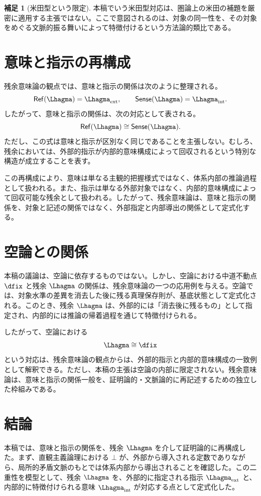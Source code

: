 \documentclass[11pt,a4paper]{article}
\newcommand{\refe}{\mathsf{Ref}}
\newcommand{\sense}{\mathsf{Sense}}
\newcommand{\lext}{\Lhagma_{\mathrm{ext}}}
\newcommand{\lint}{\Lhagma_{\mathrm{int}}}
\theoremstyle{definition}
\newtheorem{remark}{補足}[section]
\begin{document}
\begin{remark}[米田型という限定]
本稿でいう米田型対応は、圏論上の米田の補題を厳密に適用する主張ではない。ここで意図されるのは、対象の同一性を、その対象をめぐる文脈的振る舞いによって特徴付けるという方法論的類比である。
\end{remark}

\section{意味と指示の再構成}

残余意味論の観点では、意味と指示の関係は次のように整理される。
\[
\refe(\Lhagma) = \lext,
\qquad
\sense(\Lhagma) = \lint .
\]
したがって、意味と指示の関係は、次の対応として表される。
\[
\refe(\Lhagma) \cong \sense(\Lhagma).
\]
ただし、この式は意味と指示が区別なく同じであることを主張しない。むしろ、残余においては、外部的指示が内部的意味構成によって回収されるという特別な構造が成立することを表す。

この再構成により、意味は単なる主観的把握様式ではなく、体系内部の推論過程として扱われる。また、指示は単なる外部対象ではなく、内部的意味構成によって回収可能な残余として扱われる。したがって、残余意味論は、意味と指示の関係を、対象と記述の関係ではなく、外部指定と内部導出の関係として定式化する。

\section{空論との関係}

本稿の議論は、空論に依存するものではない。しかし、空論における中道不動点 $\dfix$ と残余 $\Lhagma$ の関係は、残余意味論の一つの応用例を与える。空論では、対象水準の差異を消去した後に残る真理保存則が、基底状態として定式化される。このとき、残余 $\Lhagma$ は、外部的には「消去後に残るもの」として指定され、内部的には推論の帰着過程を通じて特徴付けられる。

したがって、空論における
\[
\Lhagma \cong \dfix
\]
という対応は、残余意味論の観点からは、外部的指示と内部的意味構成の一致例として解釈できる。ただし、本稿の主張は空論の内部に限定されない。残余意味論は、意味と指示の関係一般を、証明論的・文脈論的に再記述するための独立した枠組みである。

\section{結論}

本稿では、意味と指示の関係を、残余 $\Lhagma$ を介して証明論的に再構成した。まず、直観主義論理における $\bot$ が、外部から導入される定数でありながら、局所的矛盾文脈のもとでは体系内部から導出されることを確認した。この二重性を模型として、残余 $\Lhagma$ を、外部的に指定される指示 $\lext$ と、内部的に特徴付けられる意味 $\lint$ が対応する点として定式化した。
\end{document}
